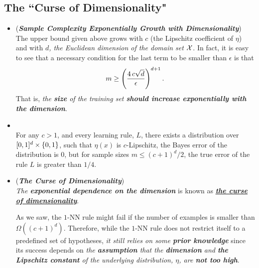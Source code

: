 \documentclass[11pt]{article}
\begin{document}
\subsection{The ``Curse of Dimensionality"}
\begin{itemize}
\item \begin{remark} (\emph{\textbf{Sample Complexity Exponentially Growth with Dimensionality}})\\
The upper bound given above grows with $c$ (the Lipschitz coefficient of $\eta$) and with \emph{$d$, the Euclidean dimension of the domain set ${\mathcal X}$}. In fact, it is easy to see that a necessary condition for the last term to be smaller than  $\epsilon$ is that
\begin{align*}
m \ge \left(\frac{4\,c\sqrt{d}}{\epsilon}\right)^{d+1}.
\end{align*}
That is, \emph{the \textbf{size} of the training set \textbf{should increase exponentially with the dimension}}.
\end{remark}

\item \begin{proposition} \citep{shalev2014understanding}\\
For any $c > 1$, and every learning rule, $L$, there exists a distribution over $[0,1]^d \times \left\{0,1\right\}$, such that $\eta(x)$ is $c$-Lipschitz, the Bayes error of the distribution is $0$, but for sample sizes $m \le (c + 1)^d/2$, the true error of the rule $L$ is greater than $1/4$.
\end{proposition}

\item \begin{remark}  (\textbf{\emph{The Curse of Dimensionality}})\\
\emph{The \textbf{exponential dependence on the dimension}} is known as \underline{\emph{\textbf{the curse of dimensionality}}}. 

As we saw, the $1$-NN rule might fail if the number of examples is smaller than $\Omega((c + 1)^d)$. Therefore, while the $1$-NN rule does not restrict itself to a predefined set of hypotheses, \emph{it still relies on some \textbf{prior knowledge}} since its success depends on \emph{the \textbf{assumption} that the \textbf{dimension} and \textbf{the Lipschitz constant} of the underlying distribution, $\eta$, are \textbf{not too high}}.
\end{remark}

\end{itemize}
\newpage


\end{document}
